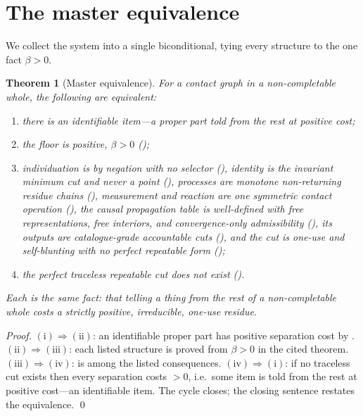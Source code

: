 \documentclass[11pt,twocolumn,a4paper]{article}
\theoremstyle{thmstyle}
\newtheorem{theorem}{Theorem}[section]
\theoremstyle{definition}
\theoremstyle{remark}
\newcommand{\flo}{\beta}                 %
\begin{document}
\section{The master equivalence}
\label{sec:master}

We collect the system into a single biconditional, tying every structure to
the one fact $\flo>0$.

\begin{theorem}[Master equivalence]
\label{thm:master}
For a contact graph in a non-completable whole, the following are
equivalent:
\begin{enumerate}[label=\textup{(\roman*)},leftmargin=2.2em]
\item there is an identifiable item---a proper part told from the rest at
positive cost;
\item the floor is positive, $\flo>0$ ();
\item individuation is by negation with no selector (),
identity is the invariant minimum cut and never a point
(), processes are monotone non-returning residue chains
(), measurement and reaction are one
symmetric contact operation (), the causal
propagation table is well-defined with free representations, free interiors,
and convergence-only admissibility (), its outputs are
catalogue-grade accountable cuts (), and the cut
is one-use and self-blunting with no perfect repeatable form
();
\item the perfect traceless repeatable cut does not exist
().
\end{enumerate}
Each is the same fact: that telling a thing from the rest of a
non-completable whole costs a strictly positive, irreducible, one-use
residue.
\end{theorem}

\begin{proof}
$(\mathrm{i})\Rightarrow(\mathrm{ii})$: an identifiable proper part has
positive separation cost by .
$(\mathrm{ii})\Rightarrow(\mathrm{iii})$: each listed structure is proved
from $\flo>0$ in the cited theorem.
$(\mathrm{iii})\Rightarrow(\mathrm{iv})$:  is among the
listed consequences. $(\mathrm{iv})\Rightarrow(\mathrm{i})$: if no traceless
cut exists then every separation costs $>0$, i.e.\ some item is told from
the rest at positive cost---an identifiable item. The cycle closes; the
closing sentence restates the equivalence. \qed
\end{proof}
\end{document}
